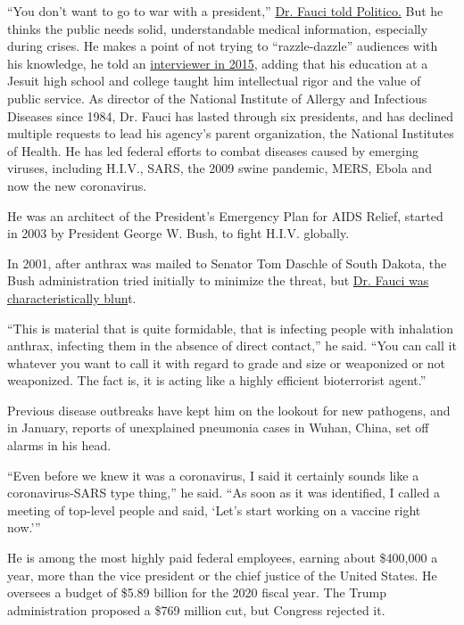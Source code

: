 ``You don't want to go to war with a president,''
\href{https://www.politico.com/news/2020/03/03/anthony-fauci-trump-coronavirus-crisis-118961}{Dr.
Fauci told Politico.} But he thinks the public needs solid,
understandable medical information, especially during crises. He makes a
point of not trying to ``razzle-dazzle'' audiences with his knowledge,
he told an
\href{https://www.c-span.org/video/?323680-1/qa-dr-anthony-fauci}{interviewer
in 2015}, adding that his education at a Jesuit high school and college
taught him intellectual rigor and the value of public service. As
director of the National Institute of Allergy and Infectious Diseases
since 1984, Dr. Fauci has lasted through six presidents, and has
declined multiple requests to lead his agency's parent organization, the
National Institutes of Health. He has led federal efforts to combat
diseases caused by emerging viruses, including H.I.V., SARS, the 2009
swine pandemic, MERS, Ebola and now the new coronavirus.

He was an architect of the President's Emergency Plan for AIDS Relief,
started in 2003 by President George W. Bush, to fight H.I.V. globally.

In 2001, after anthrax was mailed to Senator Tom Daschle of South
Dakota, the Bush administration tried initially to minimize the threat,
but
\href{https://www.nytimes3xbfgragh.onion/2001/10/25/us/nation-challenged-response-stung-criticism-aides-gather-coordinate-efforts.html}{Dr.
Fauci was characteristically blun}t.

``This is material that is quite formidable, that is infecting people
with inhalation anthrax, infecting them in the absence of direct
contact,'' he said. ``You can call it whatever you want to call it with
regard to grade and size or weaponized or not weaponized. The fact is,
it is acting like a highly efficient bioterrorist agent.''

Previous disease outbreaks have kept him on the lookout for new
pathogens, and in January, reports of unexplained pneumonia cases in
Wuhan, China, set off alarms in his head.

``Even before we knew it was a coronavirus, I said it certainly sounds
like a coronavirus-SARS type thing,'' he said. ``As soon as it was
identified, I called a meeting of top-level people and said, `Let's
start working on a vaccine right now.'''

He is among the most highly paid federal employees, earning about
\$400,000 a year, more than the vice president or the chief justice of
the United States. He oversees a budget of \$5.89 billion for the 2020
fiscal year. The Trump administration proposed a \$769 million cut, but
Congress rejected it.

